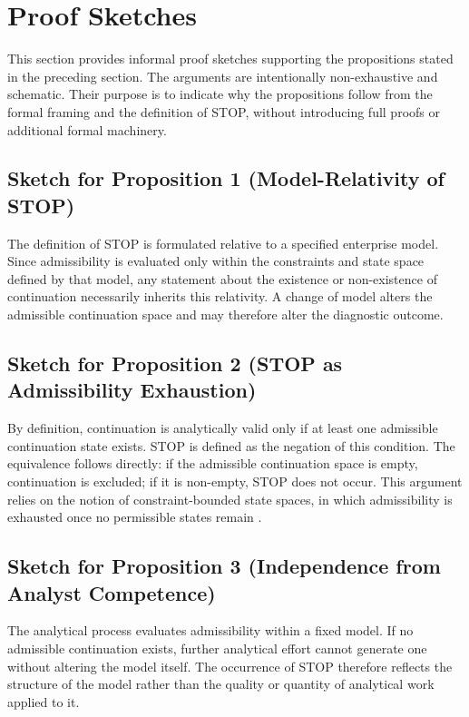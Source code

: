 ﻿\section{Proof Sketches}

This section provides informal proof sketches supporting the propositions stated in the preceding section. The arguments are intentionally non-exhaustive and schematic. Their purpose is to indicate why the propositions follow from the formal framing and the definition of STOP, without introducing full proofs or additional formal machinery.

\subsection*{Sketch for Proposition 1 (Model-Relativity of STOP)}
The definition of STOP is formulated relative to a specified enterprise model. Since admissibility is evaluated only within the constraints and state space defined by that model, any statement about the existence or non-existence of continuation necessarily inherits this relativity. A change of model alters the admissible continuation space and may therefore alter the diagnostic outcome.

\subsection*{Sketch for Proposition 2 (STOP as Admissibility Exhaustion)}
By definition, continuation is analytically valid only if at least one admissible continuation state exists. STOP is defined as the negation of this condition. The equivalence follows directly: if the admissible continuation space is empty, continuation is excluded; if it is non-empty, STOP does not occur. This argument relies on the notion of constraint-bounded state spaces, in which admissibility is exhausted once no permissible states remain \cite{ashby1956}.

\subsection*{Sketch for Proposition 3 (Independence from Analyst Competence)}
The analytical process evaluates admissibility within a fixed model. If no admissible continuation exists, further analytical effort cannot generate one without altering the model itself. The occurrence of STOP therefore reflects the structure of the model rather than the quality or quantity of analytical work applied to it.

